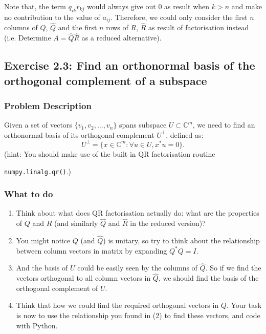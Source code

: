 \medskip

\noindent Note that, the term $q_{ik}r_{kj}$ would always give out 0 as result when $k > n$ and make no contribution to the value of  $a_{ij}$. Therefore, we could only consider the first $n$ columns of $Q$, $\hat{Q}$ and the first $n$ rows of  $R$,  $\hat{R}$ as result of factorisation instead (i.e. Determine $A = \hat{Q}\hat{R}$ as a reduced alternative).

\subsection*{Exercise 2.3: Find an orthonormal basis of the orthogonal complement of a subspace}
\subsubsection*{Problem Description}%
\label{ssub:problem_description}

Given a set of vectors $ \{v_1, v_2, \ldots, v_n\}$ spans subspace $U \subset \mathbb{C}^{m}$, we need to find an orthonormal basis of its orthogonal complement $U^{\bot}$, defined as:
\[
U^{\bot} = \{x \in \mathbb{C}^{m}: \forall u \in U, x^{*}u = 0\} 
.\] 
(hint: You should make use of the built in QR factorisation routine

\noindent \texttt{numpy.linalg.qr()}.)

\subsubsection*{What to do}%
\label{ssub:what_to_do}

\begin{enumerate}
  \item Think about what does QR factorisation actually do: what are the properties of $Q$ and $R$  (and similarly $\hat{Q}$ and $\hat{R}$ in the reduced version)?
  \item You might notice $Q$ (and $\hat{Q}$) is unitary, so try to think about the relationship between column vectors in matrix by expanding $Q^*Q = I$.
  \item And the basis of $U$ could be easily seen by the columns of $\hat{Q}$. So if we find the vectors orthogonal to all column vectors in $\hat{Q}$, we should find the basis of the orthogonal complement of $U$.
  \item Think that how we could find the required orthogonal vectors in $Q$. Your task is now to use the relationship you found in (2) to find these vectors, and code with Python.
\end{enumerate}

